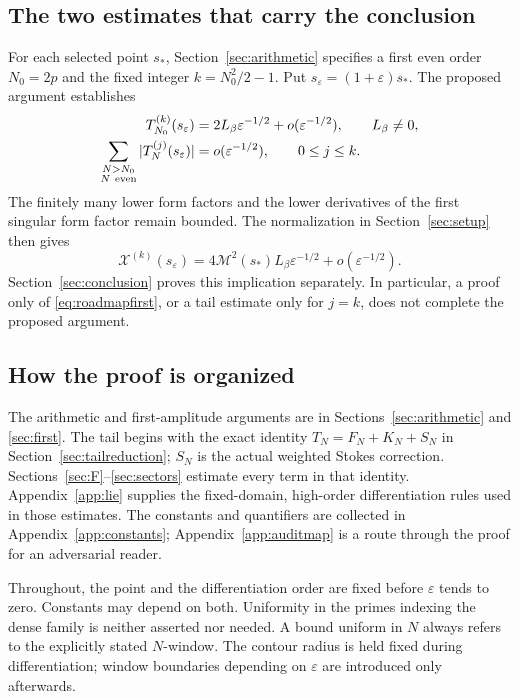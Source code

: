 \documentclass[11pt]{article}
\numberwithin{equation}{section}
\theoremstyle{definition}
\newcommand{\eps}{\varepsilon}
\newcommand{\M}{\mathcal M}
\begin{document}
\subsection{The two estimates that carry the conclusion}
For each selected point \(s_*\), Section~\ref{sec:arithmetic} specifies
a first even order \(N_0=2p\) and the fixed integer
\(k=N_0^2/2-1\). Put \(s_\eps=(1+\eps)s_*\). The proposed argument
establishes
\begin{align}
 T_{N_0}^{(k)}(s_\eps)
   &=2L_\beta\eps^{-1/2}+o(\eps^{-1/2}),\qquad L_\beta\ne0,
       \label{eq:roadmapfirst}\\
 \sum_{\substack{N>N_0\\N\ {\rm even}}}
       |T_N^{(j)}(s_\eps)|
   &=o(\eps^{-1/2}),\qquad 0\le j\le k .
       \label{eq:roadmaptail}
\end{align}
The finitely many lower form factors and the lower derivatives of the
first singular form factor remain bounded. The normalization in
Section~\ref{sec:setup} then gives
\[
 \mathcal X^{(k)}(s_\eps)
   =4\M^2(s_*)L_\beta\eps^{-1/2}+o(\eps^{-1/2}).
\]
Section~\ref{sec:conclusion} proves this implication separately.
In particular, a proof only of \eqref{eq:roadmapfirst}, or a tail
estimate only for \(j=k\), does not complete the proposed argument.

\subsection{How the proof is organized}
The arithmetic and first-amplitude arguments are in
Sections~\ref{sec:arithmetic} and \ref{sec:first}. The tail begins
with the exact identity \(T_N=F_N+K_N+S_N\) in
Section~\ref{sec:tailreduction}; \(S_N\) is the actual weighted
Stokes correction. Sections~\ref{sec:F}--\ref{sec:sectors} estimate
every term in that identity. Appendix~\ref{app:lie} supplies the
fixed-domain, high-order differentiation rules used in those estimates.
The constants and quantifiers are collected in
Appendix~\ref{app:constants}; Appendix~\ref{app:auditmap} is a route
through the proof for an adversarial reader.

Throughout, the point and the differentiation order are fixed before
\(\eps\) tends to zero. Constants may depend on both. Uniformity in
the primes indexing the dense family is neither asserted nor needed.
A bound uniform in \(N\) always refers to the explicitly stated
\(N\)-window. The contour radius is held fixed during differentiation;
window boundaries depending on \(\eps\) are introduced only afterwards.
\end{document}
